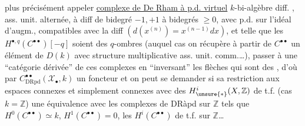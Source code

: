 
plus précisément appeler \uline{complexe de De Rham à p.d. virtuel}   $k$-bi-algèbre diff. , ass. unit. alternée, à diff de bidegré $-1,+1$  à bidegrés $\geq 0$, avec p.d. sur l'idéal d'augm., compatibles avec la diff $(d(x^{(n)})=x^{(n-1)}dx)$, et telle que les $H^{\bullet,q}(C^{\bullet\bullet})[-q]$ soient des $q$-ombres (auquel cas on récupère à partir de $C^{\bullet\bullet}$ un élément de $D(k)$ avec structure multiplicative ass. unit. comm.\dots), passer à une ``catégorie dérivée'' de ces complexes en ``inversant'' les flèches qui sont des , d'où par $C^{\bullet\bullet}_{\mathrm{DRpd}}(\mathcal X_\bullet,k)$ un foncteur
et on peut se demander si sa restriction aux espaces connexes et simplement connexes avec des $H^i_{\unsure{*}}(X,\mathbb Z)$ de t.f. (cas $k=\mathbb Z$)   une équivalence avec les complexes de DRàpd sur $\mathbb Z$ tels que $H^0(C^{\bullet\bullet})\simeq k$, $H^1(C^{\bullet\bullet})=0$, les $H^i(C^{\bullet\bullet})$ de t.f. sur $\mathbb Z$\dots

